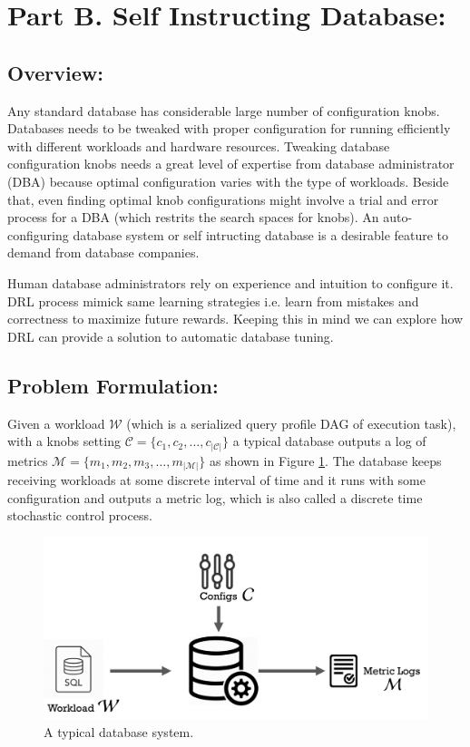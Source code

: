 \section{Part B.  Self Instructing Database:}
\label{part_b}
\subsection{Overview:}
Any standard database has considerable large number of configuration knobs. Databases needs to be tweaked with proper configuration for running efficiently with different workloads and hardware resources. Tweaking database configuration knobs needs a great level of expertise from database administrator (DBA) because optimal configuration varies with the type of workloads. Beside that, even finding optimal knob configurations might involve a trial and error process for a DBA (which restrits the search spaces for knobs). An auto-configuring database system or self intructing database is a desirable feature to demand from database companies.


Human database administrators rely on experience and intuition to configure it. DRL process mimick same learning strategies i.e. learn from mistakes and correctness to maximize future rewards. Keeping this in mind we can explore how DRL can provide a solution to automatic database tuning.


\subsection{Problem Formulation:}
Given a workload $\mathcal{W}$ (which is a serialized query profile DAG of execution task), with a knobs setting $\mathcal{C} = \{c_1,c_2,\ldots,c_{|\mathcal{C}|}\}$ a typical database outputs a log of metrics $\mathcal{M} = \{m_1,m_2,m_3,\ldots,m_{|\mathcal{M}|}\}$ as shown in Figure \ref{fig:database_01}.
The database keeps receiving workloads at some discrete interval of time and it runs with some configuration and outputs a metric log, which is also called a discrete time stochastic control process.

\begin{figure}[h]
	\includegraphics[width=0.9\linewidth ]{fig/database_01.png}
    \vspace{-2mm}
    \caption{A typical database system.}
    \label{fig:database_01}
\end{figure}


